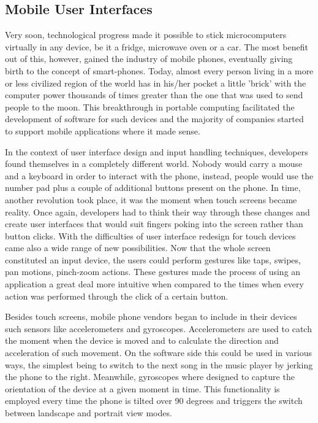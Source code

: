 \subsection{Mobile User Interfaces}

Very soon, technological progress made it possible to stick microcomputers
virtually in any device, be it a fridge, microwave oven or a car. The most
benefit out of this, however, gained the industry of mobile phones, eventually
giving birth to the concept of smart-phones. Today, almost every person living
in a more or less civilized region of the world has in his/her pocket a little
'brick' with the computer power thousands of times greater than the one that
was used to send people to the moon. This breakthrough in portable computing
facilitated the development of software for such devices and the majority of
companies started to support mobile applications where it made sense.

In the context of user interface design and input handling techniques,
developers found themselves in a completely different world. Nobody would
carry a mouse and a keyboard in order to interact with the phone, instead,
people would use the number pad plus a couple of additional buttons present on
the phone. In time, another revolution took place, it was the moment when
touch screens became reality. Once again, developers had to think their way
through these changes and create user interfaces that would suit fingers
poking into the screen rather than button clicks. With the difficulties of
user interface redesign for touch devices came also a wide range of new
possibilities. Now that the whole screen constituted an input device, the
users could perform gestures like taps, swipes, pan motions, pinch-zoom
actions. These gestures made the process of using an application a great deal
more intuitive when compared to the times when every action was performed
through the click of a certain button.

Besides touch screens, mobile phone vendors began to include in their devices
such sensors like accelerometers and gyroscopes. Accelerometers are used to
catch the moment when the device is moved and to calculate the direction and
acceleration of such movement. On the software side this could be used in
various ways, the simplest being to switch to the next song in the music
player by jerking the phone to the right. Meanwhile, gyroscopes where designed
to capture the orientation of the device at a given moment in time. This
functionality is employed every time the phone is tilted over 90 degrees and
triggers the switch between landscape and portrait view modes.


